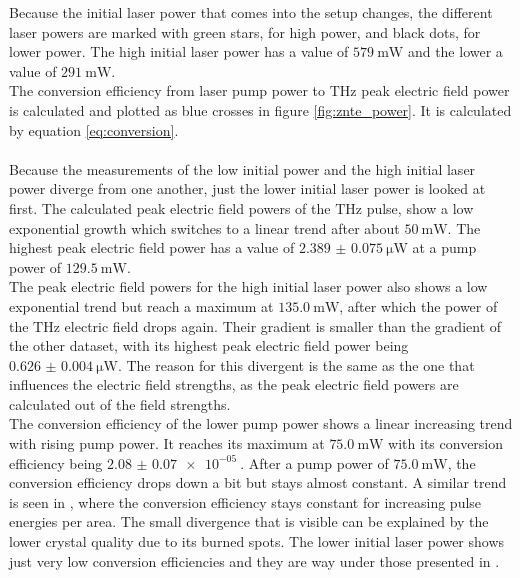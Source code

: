 Because the initial laser power that comes into the setup changes, the different laser powers are marked with green stars, for high power, and black dots, for lower power.
The high initial laser power has a value of $\SI{579}{\milli\W}$ and the lower a value of $\SI{291}{\milli\W}$.
\\
The conversion efficiency from laser pump power to $\si{\tera\hertz}$ peak electric field power is calculated and plotted as blue crosses in figure \ref{fig:znte_power}.
It is calculated by equation \eqref{eq:conversion}.
\\\\
Because the measurements of the low initial power and the high initial laser power diverge from one another, just the lower initial laser power is looked at first.
The calculated peak electric field powers of the $\si{\tera\hertz}$ pulse, show a low exponential growth which switches to a linear trend after about $\SI{50}{\milli\W}$.
The highest peak electric field power has a value of $\SI{2.389(75)}{\micro\W}$ at a pump power of $\SI{129.5}{\milli\W}$.
\\
The peak electric field powers for the high initial laser power also shows a low exponential trend but reach a maximum at $\SI{135.0}{\milli\W}$, after which the power of the $\si{\tera\hertz}$ electric field drops again.
Their gradient is smaller than the gradient of the other dataset, with its highest peak electric field power being $\SI{0.626(4)}{\micro\W}$.
The reason for this divergent is the same as the one that influences the electric field strengths, as the peak electric field powers are calculated out of the field strengths.
\\
The conversion efficiency of the lower pump power shows a linear increasing trend with rising pump power.
It reaches its maximum at $\SI{75.0}{\milli\W}$ with its conversion efficiency being $\SI{2.08(7)e-05}{}$.
After a pump power of $\SI{75.0}{\milli\W}$, the conversion efficiency drops down a bit but stays almost constant.
A similar trend is seen in \cite{THZ_eltric_field}, where the conversion efficiency stays constant for increasing pulse energies per area.
The small divergence that is visible can be explained by the lower crystal quality due to its burned spots.
The lower initial laser power shows just very low conversion efficiencies and they are way under those presented in \cite{THZ_eltric_field}.
\\\\
